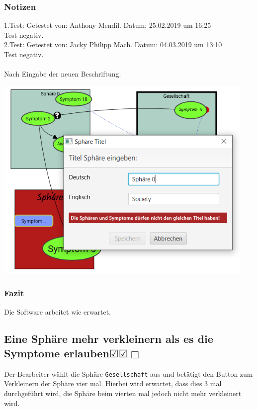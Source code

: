 \documentclass[enabledeprecatedfontcommands]{scrartcl}
\newcommand{\subsectiont}[2]{\subsection[#1]{#1{\normalsize\normalfont #2}}}
\newcommand{\leer}{$\Box$}
\newcommand{\ok}{$\CheckedBox$}
\begin{document}
\subsubsection{Notizen}
1.Test: Getestet von: Anthony Mendil. Datum: 25.02.2019 um 16:25 \\
Test negativ. \\
2.Test: Getestet von: Jacky Philipp Mach. Datum: 04.03.2019 um 13:10 \\
Test negativ.\\\\
Nach Eingabe der neuen Beschriftung: 
\begin{center}
\includegraphics[height=10cm]{3_50.PNG}
\end{center}
\subsubsection{Fazit}
Die Software arbeitet wie erwartet.

\subsectiont{Eine Sphäre mehr verkleinern als es die Symptome erlauben}{\dotfill\ok\ok\leer}
Der Bearbeiter wählt die Sphäre \texttt{Gesellschaft} aus und betätigt den Button zum Verkleinern der Sphäre vier mal. Hierbei wird erwartet, dass dies 3 mal durchgeführt wird, die Sphäre beim vierten mal jedoch nicht mehr verkleinert wird. 
\end{document}
